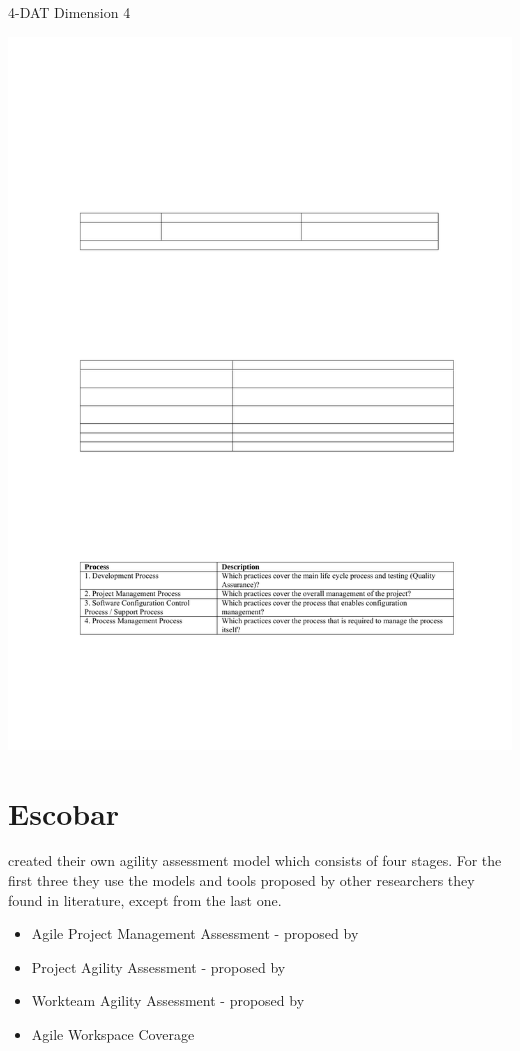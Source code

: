\begin{table}[H]
\caption{4-DAT Dimension 4}
\label{fig:dimension4}
\centerline{\includegraphics[scale=0.8]{include/relatedwork/fig/qumer_dimension4.pdf}}
\end{table}



\section{Escobar}

\citet{6427226} created their own agility assessment model which consists of four stages. For the first three they use the models and tools proposed by other researchers they found in literature, except from the last one.
\begin{itemize}
\item Agile Project Management Assessment - proposed by \citet{qumer2006measuring}
\item Project Agility Assessment - proposed by \citet{taylor}
\item Workteam Agility Assessment - proposed by \citet{Leffingwell:2007:SSA:1201958}
\item Agile Workspace Coverage
\end{itemize}

